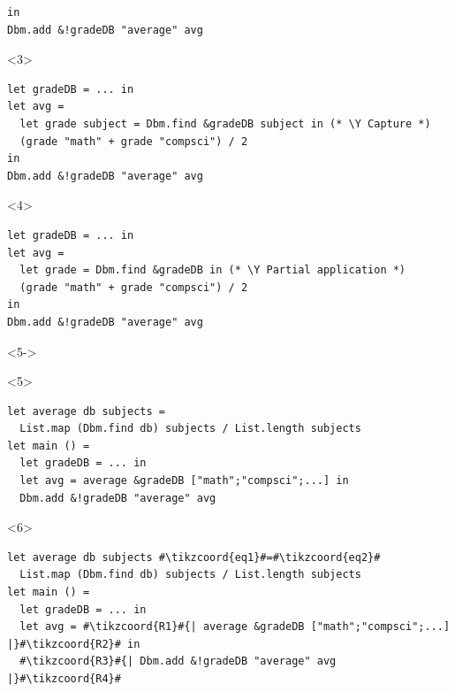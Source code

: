 \documentclass[aspectratio=169,dvipsnames,svgnames,10pt]{beamer}
\newcommand\Y{{\color{Green}{\ding{52}}}}
\begin{document}
\begin{frame}[fragile]
\begin{onlyenv}
\begin{verbatim}
in
Dbm.add &!gradeDB "average" avg
\end{verbatim}
  \end{onlyenv}
  \begin{onlyenv}<3>
\begin{verbatim}
let gradeDB = ... in
let avg =
  let grade subject = Dbm.find &gradeDB subject in (* \Y Capture *)
  (grade "math" + grade "compsci") / 2
in
Dbm.add &!gradeDB "average" avg
\end{verbatim}
  \end{onlyenv}
  \begin{onlyenv}<4>
\begin{verbatim}
let gradeDB = ... in
let avg =
  let grade = Dbm.find &gradeDB in (* \Y Partial application *)
  (grade "math" + grade "compsci") / 2
in
Dbm.add &!gradeDB "average" avg
\end{verbatim}
  \end{onlyenv}
  \begin{onlyenv}<5->
    \begin{onlyenv}<5>%
\begin{verbatim}
let average db subjects = 
  List.map (Dbm.find db) subjects / List.length subjects
let main () =
  let gradeDB = ... in
  let avg = average &gradeDB ["math";"compsci";...] in
  Dbm.add &!gradeDB "average" avg
\end{verbatim}
    \end{onlyenv}%
    \begin{onlyenv}<6>%
\begin{verbatim}
let average db subjects #\tikzcoord{eq1}#=#\tikzcoord{eq2}#
  List.map (Dbm.find db) subjects / List.length subjects
let main () =
  let gradeDB = ... in
  let avg = #\tikzcoord{R1}#{| average &gradeDB ["math";"compsci";...] |}#\tikzcoord{R2}# in
  #\tikzcoord{R3}#{| Dbm.add &!gradeDB "average" avg |}#\tikzcoord{R4}#
\end{verbatim}
    \end{onlyenv}%
  \end{onlyenv}%
\end{frame}
\end{document}
